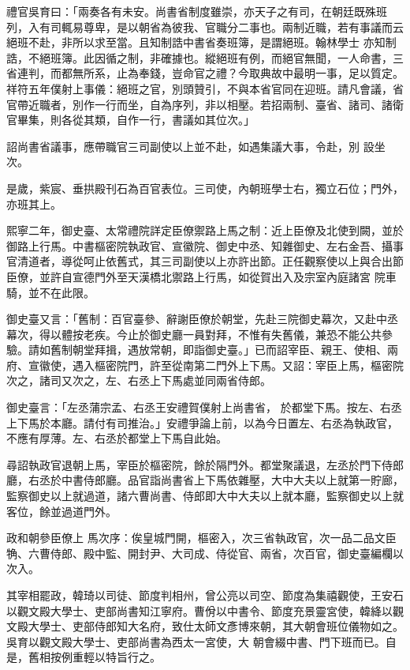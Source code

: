 \begin{pinyinscope}
 禮官吳育曰：「兩奏各有未安。尚書省制度雖崇，亦天子之有司，在朝廷既殊班列，入有司輒易尊卑，是以朝省為彼我、官職分二事也。兩制近職，若有事議而云絕班不赴，非所以求至當。且知制誥中書省奏班簿，是謂絕班。翰林學士
 亦知制誥，不絕班簿。此因循之制，非確據也。縱絕班有例，而絕官無聞，一人命書，三省連判，而都無所系，止為奉錢，豈命官之禮？今取典故中最明一事，足以質定。祥符五年僕射上事儀：絕班之官，別頭贊引，不與本省官同在迎班。請凡會議，省官帶近職者，別作一行而坐，自為序列，非以相壓。若招兩制、臺省、諸司、諸衛官畢集，則各從其類，自作一行，書議如其位次。」



 詔尚書省議事，應帶職官三司副使以上並不赴，如遇集議大事，令赴，別
 設坐次。



 是歲，紫宸、垂拱殿刊石為百官表位。三司使，內朝班學士右，獨立石位；門外，亦班其上。



 熙寧二年，御史臺、太常禮院詳定臣僚禦路上馬之制：近上臣僚及北使到闕，並於御路上行馬。中書樞密院執政官、宣徽院、御史中丞、知雜御史、左右金吾、攝事官清道者，導從呵止依舊式，其三司副使以上亦許出節。正任觀察使以上與合出節臣僚，並許自宣德門外至天漢橋北禦路上行馬，如從賀出入及宗室內庭諸宮
 院車騎，並不在此限。



 御史臺又言：「舊制：百官臺參、辭謝臣僚於朝堂，先赴三院御史幕次，又赴中丞幕次，得以體按老疾。今止於御史廳一員對拜，不惟有失舊儀，兼恐不能公共參驗。請如舊制朝堂拜揖，遇放常朝，即詣御史臺。」已而詔宰臣、親王、使相、兩府、宣徽使，遇入樞密院門，許至從南第二門外上下馬。又詔：宰臣上馬，樞密院次之，諸司又次之，左、右丞上下馬處並同兩省侍郎。



 御史臺言：「左丞蒲宗孟、右丞王安禮賀僕射上尚書省，
 於都堂下馬。按左、右丞上下馬於本廳。請付有司推治。」安禮爭論上前，以為今日置左、右丞為執政官，不應有厚薄。左、右丞於都堂上下馬自此始。



 尋詔執政官退朝上馬，宰臣於樞密院，餘於隔門外。都堂聚議退，左丞於門下侍郎廳，右丞於中書侍郎廳。品官詣尚書省上下馬依雜壓，大中大夫以上就第一貯廊，監察御史以上就過道，諸六曹尚書、侍郎即大中大夫以上就本廳，監察御史以上就客位，餘並過道門外。



 政和朝參臣僚上
 馬次序：俟皇城門開，樞密入，次三省執政官，次一品二品文臣觕、六曹侍郎、殿中監、開封尹、大司成、侍從官、兩省，次百官，御史臺編欄以次入。



 其宰相罷政，韓琦以司徒、節度判相州，曾公亮以司空、節度為集禧觀使，王安石以觀文殿大學士、吏部尚書知江寧府。曹佾以中書令、節度充景靈宮使，韓絳以觀文殿大學士、吏部侍郎知大名府，致仕太師文彥博來朝，其大朝會班位儀物如之。吳育以觀文殿大學士、吏部尚書為西太一宮使，大
 朝會綴中書、門下班而已。自是，舊相按例重輕以特旨行之。




\end{pinyinscope}
